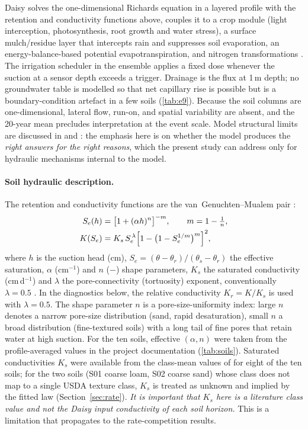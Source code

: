 Daisy solves the one-dimensional Richards equation in a layered profile with the retention and conductivity functions above, couples it to a crop module (light interception, photosynthesis, root growth and water stress), a surface mulch/residue layer that intercepts rain and suppresses soil evaporation, an energy-balance-based potential evapotranspiration, and nitrogen transformations \citep{Hansen1991,Hansen2012,Holbak2026}. The irrigation scheduler in the ensemble applies a fixed dose whenever the suction at a sensor depth exceeds a trigger. Drainage is the flux at 1\,m depth; no groundwater table is modelled so that net capillary rise is possible but is a boundary-condition artefact in a few soils (\cref{tab:e9}). Because the soil columns are one-dimensional, lateral flow, run-on, and spatial variability are absent, and the 20-year mean precludes interpretation at the event scale. Model structural limits are discussed in \citet{Refsgaard2004} and \citet{Kirchner2006}: the emphasis here is on whether the model produces the \emph{right answers for the right reasons}, which the present study can address only for hydraulic mechanisms internal to the model.

\paragraph{Soil hydraulic description.}
The retention and conductivity functions are the van~Genuchten--Mualem pair \citep{vanGenuchten1980,Mualem1976}:
\begin{align}
S_e(h) &= \bigl[1+(\alpha h)^{n}\bigr]^{-m}, \qquad m = 1-\tfrac{1}{n},\label{eq:vg}\\
K(S_e) &= K_s\, S_e^{\,\lambda}\Bigl[1-\bigl(1-S_e^{1/m}\bigr)^{m}\Bigr]^{2},\label{eq:mualem}
\end{align}
where $h$ is the suction head (cm), $S_e=(\theta-\theta_r)/(\theta_s-\theta_r)$ the effective saturation, $\alpha$ (cm$^{-1}$) and $n$ ($-$) shape parameters, $K_s$ the saturated conductivity (cm\,d$^{-1}$) and $\lambda$ the pore-connectivity (tortuosity) exponent, conventionally $\lambda=0.5$ \citep{Mualem1976}. In the diagnostics below, the relative conductivity $K_r=K/K_s$ is used with $\lambda=0.5$. The shape parameter $n$ is a pore-size-uniformity index: large $n$ denotes a narrow pore-size distribution (sand, rapid desaturation), small $n$ a broad distribution (fine-textured soils) with a long tail of fine pores that retain water at high suction. For the ten soils, effective $(\alpha,n)$ were taken from the profile-averaged values in the project documentation (\cref{tab:soils}). Saturated conductivities $K_s$ were available from the class-mean values of \citet{Carsel1988} for eight of the ten soils; for the two soils (S01 coarse loam, S02 coarse sand) whose class does not map to a single USDA texture class, $K_s$ is treated as unknown and implied by the fitted law (Section~\ref{sec:rate}). \emph{It is important that $K_s$ here is a literature class value and not the Daisy input conductivity of each soil horizon.} This is a limitation that propagates to the rate-competition results.

